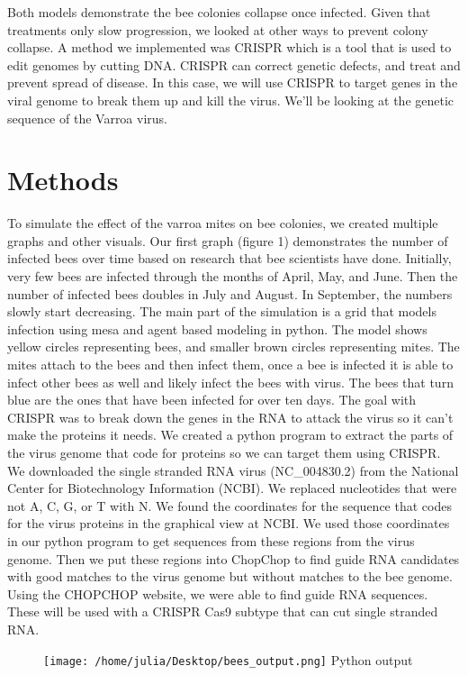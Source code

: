\documentclass[final,5p,times,twocolumn,authoryear]{elsarticle}
\begin{document}
Both models demonstrate the bee colonies collapse once infected. Given that treatments only slow progression, we looked at other ways to prevent colony collapse. A method we implemented was CRISPR which is a tool that is used to edit genomes by cutting DNA. CRISPR can correct genetic defects, and treat and prevent spread of disease. In this case, we will use CRISPR to target genes in the viral genome to break them up and kill the virus. We’ll be looking at the genetic sequence of the Varroa virus.


\section{Methods}
\label{Methods}
To simulate the effect of the varroa mites on bee colonies, we created multiple graphs and other visuals. Our first graph (figure 1)  demonstrates the number of infected bees over time based on research that bee scientists have done. Initially, very few bees are infected through the months of April, May, and June. Then the number of infected bees doubles in July and August. In September, the numbers slowly start decreasing. The main part of the simulation is a grid that models infection using mesa and agent based modeling in python. The model shows yellow circles representing bees, and smaller brown circles representing mites. The mites attach to the bees and then infect them, once a bee is infected it is able to infect other bees as well and likely infect the bees with virus. The bees that turn blue are the ones that have been infected for over ten days. 
The goal with CRISPR was to break down the genes in the RNA to attack the virus so it can’t make the proteins it needs. We created a python program to extract the parts of the virus genome that code for proteins so we can target them using CRISPR. We downloaded the single stranded RNA virus (NC\_004830.2) from the National Center for Biotechnology Information (NCBI). We replaced nucleotides that were not A, C, G, or T with N. We found the coordinates for the sequence that codes for the virus proteins in the graphical view at NCBI. We used those coordinates in our python program to get sequences from these regions from the virus genome. Then we put these regions into ChopChop to find guide RNA candidates with good matches to the virus genome but without matches to the bee genome. Using the CHOPCHOP website, we were able to find guide RNA sequences. These will be used with a CRISPR Cas9 subtype that can cut single stranded RNA.

\begin{figure}
  \centering
  \texttt{[image: /home/julia/Desktop/bees\_output.png]}
  Python output
\end{figure}
\end{document}
